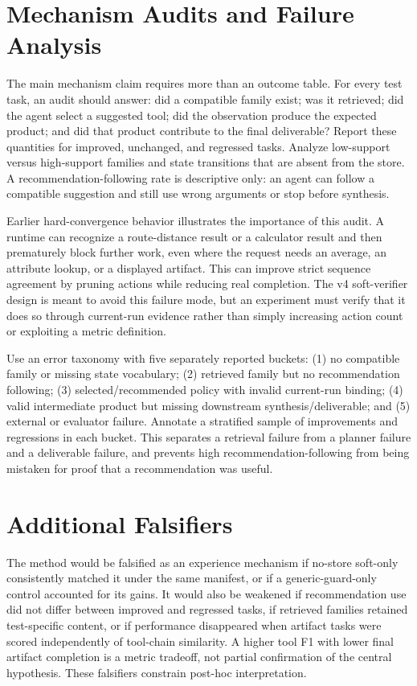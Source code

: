 \documentclass[10pt]{article}
\begin{document}
\section{Mechanism Audits and Failure Analysis}
The main mechanism claim requires more than an outcome table. For every test task, an audit should answer: did a compatible family exist; was it retrieved; did the agent select a suggested tool; did the observation produce the expected product; and did that product contribute to the final deliverable? Report these quantities for improved, unchanged, and regressed tasks. Analyze low-support versus high-support families and state transitions that are absent from the store. A recommendation-following rate is descriptive only: an agent can follow a compatible suggestion and still use wrong arguments or stop before synthesis.

Earlier hard-convergence behavior illustrates the importance of this audit. A runtime can recognize a route-distance result or a calculator result and then prematurely block further work, even where the request needs an average, an attribute lookup, or a displayed artifact. This can improve strict sequence agreement by pruning actions while reducing real completion. The v4 soft-verifier design is meant to avoid this failure mode, but an experiment must verify that it does so through current-run evidence rather than simply increasing action count or exploiting a metric definition.

Use an error taxonomy with five separately reported buckets: (1) no compatible family or missing state vocabulary; (2) retrieved family but no recommendation following; (3) selected/recommended policy with invalid current-run binding; (4) valid intermediate product but missing downstream synthesis/deliverable; and (5) external or evaluator failure. Annotate a stratified sample of improvements and regressions in each bucket. This separates a retrieval failure from a planner failure and a deliverable failure, and prevents high recommendation-following from being mistaken for proof that a recommendation was useful.

\section{Additional Falsifiers}
The method would be falsified as an experience mechanism if no-store soft-only consistently matched it under the same manifest, or if a generic-guard-only control accounted for its gains. It would also be weakened if recommendation use did not differ between improved and regressed tasks, if retrieved families retained test-specific content, or if performance disappeared when artifact tasks were scored independently of tool-chain similarity. A higher tool F1 with lower final artifact completion is a metric tradeoff, not partial confirmation of the central hypothesis. These falsifiers constrain post-hoc interpretation.
\end{document}
